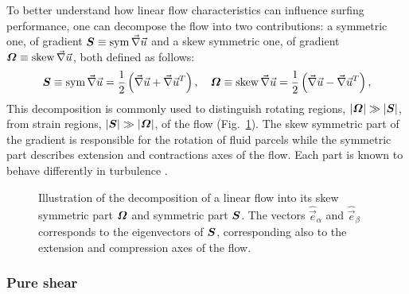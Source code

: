 To better understand how linear flow characteristics can influence surfing performance, one can decompose the flow into two contributions: a symmetric one, of gradient $\boldsymbol{S} \equiv \operatorname{sym} \vec{\nabla} \vec{u}$ and a skew symmetric one, of gradient $\boldsymbol{\varOmega} \equiv \operatorname{skew} \vec{\nabla} \vec{u}$, both defined as follows:
\begin{equation}\label{eq:sym_def}
	\boldsymbol{S} \equiv \operatorname{sym} \vec{\nabla} \vec{u} = \frac{1}{2} \left( \vec{\nabla} \vec{u} + \vec{\nabla} \vec{u}^T \right), \quad \boldsymbol{\varOmega} \equiv \operatorname{skew} \vec{\nabla} \vec{u} = \frac{1}{2} \left( \vec{\nabla} \vec{u} - \vec{\nabla} \vec{u}^T \right),
\end{equation}
This decomposition is commonly used to distinguish rotating regions, $\lvert\boldsymbol{\varOmega}\rvert \gg \lvert\boldsymbol{S}\rvert$, from strain regions, $\lvert\boldsymbol{S}\rvert \gg \lvert\boldsymbol{\varOmega}\rvert$, of the flow (Fig.~\ref{fig:decomposition}).
The skew symmetric part of the gradient is responsible for the rotation of fluid parcels while the symmetric part describes extension and contractions axes of the flow.
Each part is known to behave differently in turbulence \citep{meneveau2011lagrangian, fang2015short}.
\begin{figure}%
	\centering
	
	\caption[Illustration of the decomposition of a linear flow into its skew symmetric part $\GradientsAsym$ and symmetric part $\GradientsSym$.]{
		Illustration of the decomposition of a linear flow into its skew symmetric part $\GradientsAsym$ and symmetric part $\GradientsSym$. The vectors $\hat{\vec{e}}_\alpha$ and $\hat{\vec{e}}_\beta$ corresponds to the eigenvectors of $\GradientsSym$, corresponding also to the extension and compression axes of the flow.
	}
	\label{fig:decomposition}
\end{figure}

\subsubsection{Pure shear}\label{sec:the_surfing_strategy_linear_sym}


